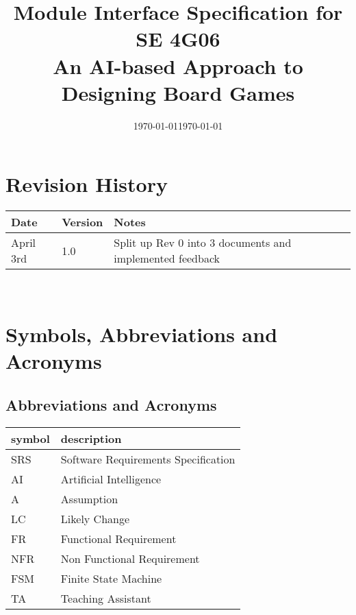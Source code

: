 \documentclass[12pt, titlepage]{article}
\begin{document}
\title{Module Interface Specification for SE 4G06 \\ An AI-based Approach to Designing Board Games} 
\author{\authname{}}
\date{\today}
\author{\authname}

\date{\today}

\maketitle


\section{Revision History}

\begin{tabularx}{\textwidth}{p{3cm}p{2cm}X}
\toprule {\bf Date} & {\bf Version} & {\bf Notes}\\
\midrule
April 3rd & 1.0 & Split up Rev 0 into 3 documents and implemented feedback\\
\bottomrule
\end{tabularx}

~\newpage

\section{Symbols, Abbreviations and Acronyms}
\subsection{Abbreviations and Acronyms}
\renewcommand{\arraystretch}{1.2}
\begin{tabular}{l l} 
  \toprule		
  \textbf{symbol} & \textbf{description}\\
  \midrule 
  SRS & Software Requirements Specification\\
  AI & Artificial Intelligence \\
  A & Assumption \\
  LC & Likely Change\\
  FR & Functional Requirement \\
  NFR & Non Functional Requirement \\
  FSM & Finite State Machine \\ 
  TA & Teaching Assistant \\
  \bottomrule
\end{tabular}\\
\newpage
\end{document}
